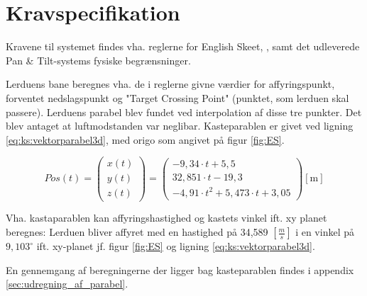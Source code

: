 \section{Kravspecifikation}
\label{sec:kravspecifikation}
Kravene til systemet findes vha. reglerne for English Skeet, \citep{ES_regler},
samt det udleverede Pan \& Tilt-systems fysiske begrænsninger.


Lerduens bane beregnes vha. de i reglerne givne værdier for affyringspunkt, forventet nedslagspunkt
og "Target Crossing Point" (punktet, som lerduen skal passere).
Lerduens parabel blev fundet ved interpolation af disse tre punkter. Det blev antaget at luftmodstanden var neglibar.
Kasteparablen er givet ved ligning \ref{eq:ks:vektorparabel3d}, med origo som angivet på figur \ref{fig:ES}.

\begin{equation}
Pos\left( t \right) = 
\left( \begin{matrix} 
	x\left( t \right)  \\ 
	y\left( t \right)  \\ 
	z\left( t \right)  \end{matrix} \right) =
	 \left( \begin{matrix} 
	- 9,34\cdot t+5,5 \\
  32,851\cdot t-19,3 \\ 
 -{ 4,91\cdot t }^{ 2 }+5,473\cdot t+3,05\end{matrix} \right) [\text{m}]
\label{eq:ks:vektorparabel3d}
\end{equation}

Vha. kastaparablen kan affyringshastighed og kastets vinkel ift. xy planet beregnes: 
Lerduen bliver affyret med en hastighed på 34,589 \([\frac{m}{s}]\) i en vinkel på \(9,103^{\circ}\) 
ift. xy-planet jf. figur \ref{fig:ES} og ligning \ref{eq:ks:vektorparabel3d}. 

En gennemgang af beregningerne der ligger bag kasteparablen findes i appendix \ref{sec:udregning_af_parabel}.

